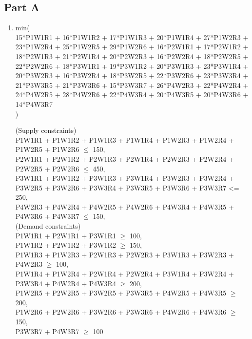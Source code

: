 \documentclass[11pt,letterpaper]{article}
\begin{document}
\subsection*{Part A}
\begin{enumerate}
	\item 
	min( \\
	15*P1W1R1 + 16*P1W1R2 + 17*P1W1R3 + 20*P1W1R4 + 27*P1W2R3 + \\
	23*P1W2R4 + 25*P1W2R5 + 29*P1W2R6 + 16*P2W1R1 + 17*P2W1R2 + \\
	18*P2W1R3 + 21*P2W1R4 + 20*P2W2R3 + 16*P2W2R4 + 18*P2W2R5 +\\
	22*P2W2R6 + 18*P3W1R1 + 19*P3W1R2 + 20*P3W1R3 + 23*P3W1R4 +\\
	20*P3W2R3 + 16*P3W2R4 + 18*P3W2R5 + 22*P3W2R6 + 23*P3W3R4 +\\
	21*P3W3R5 + 21*P3W3R6 + 15*P3W3R7 + 26*P4W2R3 + 22*P4W2R4 +\\
	24*P4W2R5 + 28*P4W2R6 + 22*P4W3R4 + 20*P4W3R5 + 20*P4W3R6 + \\
	14*P4W3R7\\
	)
	
	(Supply constraints) \\
	P1W1R1 + P1W1R2 + P1W1R3 + P1W1R4 + P1W2R3 + P1W2R4 + P1W2R5 + 
	P1W2R6 $\leq$ 150,\\
	P2W1R1 + P2W1R2 + P2W1R3 + P2W1R4 + P2W2R3 + P2W2R4 + P2W2R5 + 
	P2W2R6 $\leq$ 450, \\
	P3W1R1 + P3W1R2 + P3W1R3 + P3W1R4 + P3W2R3 + P3W2R4 + P3W2R5 + 
	P3W2R6 + P3W3R4 + P3W3R5 + P3W3R6 + P3W3R7 <= 250,\\
	P4W2R3 + P4W2R4 + P4W2R5 + P4W2R6 + P4W3R4 + P4W3R5 + P4W3R6 + 
	P4W3R7 $\leq$ 150,\\
	
	
	(Demand constraints)\\
	P1W1R1 + P2W1R1 + P3W1R1 $\geq$ 100,\\
	P1W1R2 + P2W1R2 + P3W1R2 $\geq$ 150,\\
	P1W1R3 + P1W2R3 + P2W1R3 + P2W2R3 + P3W1R3 + P3W2R3 + 
	P4W2R3 $\geq$ 100,\\
	P1W1R4 + P1W2R4 + P2W1R4 + P2W2R4 + P3W1R4 + P3W2R4 + P3W3R4 + 
	P4W2R4 + P4W3R4 $\geq$ 200,\\
	P1W2R5 + P2W2R5 + P3W2R5 + P3W3R5 + P4W2R5 + P4W3R5 $\geq$ 200,\\
	P1W2R6 + P2W2R6 + P3W2R6 + P3W3R6 + P4W2R6 + P4W3R6 $\geq$ 150,\\
	P3W3R7 + P4W3R7 $\geq$ 100
	

\end{enumerate}
\end{document}

